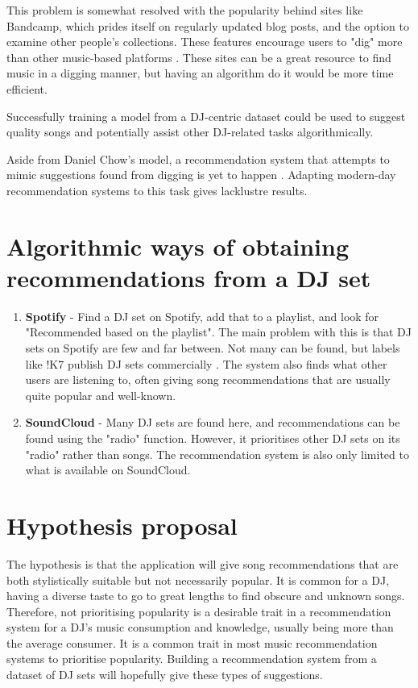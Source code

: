 This problem is somewhat resolved with the popularity behind sites like Bandcamp, which prides itself on regularly updated blog posts, and the option to examine other people's collections. These features encourage users to "dig" more than other music-based platforms \citep{bandcamp_about_2023}.  These sites can be a great resource to find music in a digging manner, but having an algorithm do it would be more time efficient. 

Successfully training a model from a DJ-centric dataset could be used to suggest quality songs and potentially assist other DJ-related tasks algorithmically.

Aside from Daniel Chow's model, a recommendation system that attempts to mimic suggestions found from digging is yet to happen \citep{chow_music_2020}. Adapting modern-day recommendation systems to this task gives lacklustre results.

\section{Algorithmic ways of obtaining recommendations from a DJ set}
\begin{enumerate}
	\item \textbf{Spotify }- Find a DJ set on Spotify, add that to a playlist, and look for "Recommended based on the playlist". The main problem with this is that DJ sets on Spotify are few and far between. Not many can be found, but labels like !K7 publish DJ sets commercially \citep{k7_about_2023}. The system also finds what other users are listening to, often giving song recommendations that are usually quite popular and well-known.
	
	\item \textbf{SoundCloud }- Many DJ sets are found here, and recommendations can be found using the "radio" function. However, it prioritises other DJ sets on its "radio" rather than songs. The recommendation system is also only limited to what is available on SoundCloud.
	
\end{enumerate}

\section{Hypothesis proposal}

The hypothesis is that the application will give song recommendations that are both stylistically suitable but not necessarily popular. It is common for a DJ, having a diverse taste to go to
great lengths to find obscure and unknown songs. Therefore, not prioritising popularity is a
desirable trait in a recommendation system for a DJ's music consumption and knowledge, usually
being more than the average consumer. It is a common trait in most music recommendation
systems to prioritise popularity. Building a recommendation system from a dataset of DJ sets
will hopefully give these types of suggestions.	

